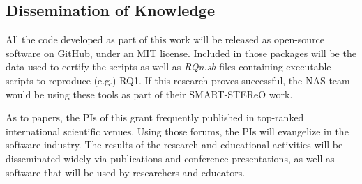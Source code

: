 \documentclass[twoside]{NSF}
\newenvironment{myitemize}
{ \begin{itemize}[topsep=0pt,itemsep=0pt,leftmargin=*]
    \setlength{\itemsep}{0pt}
    \setlength{\parskip}{0pt}
    \setlength{\parsep}{0pt}     }
{ \end{itemize}                  }
\newcommand{\bi}{\begin{myitemize}}
\newcommand{\ei}{\end{myitemize}}
\newcommand{\IT}{{\sffamily {\em \mbox{ADVICE}}}}
\begin{document}
\begin{nsfdescription}

  


 

 
\subsection{Dissemination of Knowledge}

All the code developed as part of this work will be  released as open-source software on GitHub, under an MIT license.  Included in those
packages will be the data used to certify the scripts as well as {\em RQn.sh} files containing executable scripts to reproduce (e.g.) RQ1. If this research proves successful, the NAS team would be using these tools as part of their SMART-STEReO work.

  As to papers, the PIs of this grant
  frequently published in top-ranked international scientific venues.
Using those forums, the PIs will evangelize {\IT} in the software industry.  The results of the research and educational activities will be disseminated widely via publications and conference presentations, as well as software that will be used by researchers and educators.
    


\end{nsfdescription}
\end{document}
